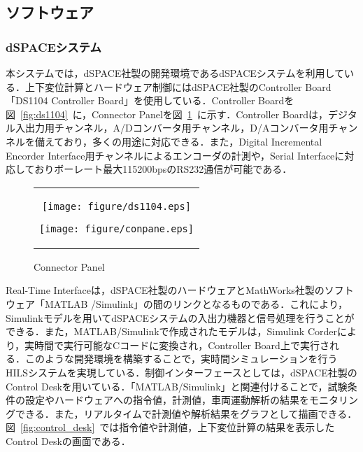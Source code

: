 \documentclass[a4paper,12pt]{article_vdlab_sotsuron}
\begin{document}
\newpage
\subsection{ソフトウェア}
\subsubsection{dSPACEシステム}
本システムでは，dSPACE社製の開発環境であるdSPACEシステムを利用している．上下変位計算とハードウェア制御にはdSPACE社製のController Board「DS1104 Controller Board」を使用している．Controller Boardを図~\ref{fig:ds1104}~に，Connector Panelを図~\ref{fig:conpane}~に示す．Controller Boardは，デジタル入出力用チャンネル，A/Dコンバータ用チャンネル，D/Aコンバータ用チャンネルを備えており，多くの用途に対応できる．また，Digital Incremental Encorder Interface用チャンネルによるエンコーダの計測や，Serial Interfaceに対応しておりボーレート最大115200bpsのRS232通信が可能である．

\vspace{10mm}
\begin{figure}[h]
    \begin{tabular}{c}
      \begin{minipage}{0.5\hsize}
	\begin{center}
	  \texttt{[image: figure/ds1104.eps]}
	  \caption{Controller Borad\cite{66}}
	  \label{fig:ds1104}
	\end{center}
      \end{minipage}
      \begin{minipage}{0.5\hsize}
	\begin{center}
	  \texttt{[image: figure/conpane.eps]}
	  \caption{Connector Panel\cite{66}}
	  \label{fig:conpane}
	\end{center}
      \end{minipage}
    \end{tabular}
\end{figure}

\vspace{10mm}
Real-Time Interfaceは，dSPACE社製のハードウェアとMathWorks社製のソフトウェア「MATLAB /Simulink」の間のリンクとなるものである．これにより，Simulinkモデルを用いてdSPACEシステムの入出力機器と信号処理を行うことができる．また，MATLAB/Simulinkで作成されたモデルは，Simulink Corderにより，実時間で実行可能なCコードに変換され，Controller Board上で実行される．このような開発環境を構築することで，実時間シミュレーションを行うHILSシステムを実現している．制御インターフェースとしては，dSPACE社製のControl Deskを用いている．「MATLAB/Simulink」と関連付けることで，試験条件の設定やハードウェアへの指令値，計測値，車両運動解析の結果をモニタリングできる．また，リアルタイムで計測値や解析結果をグラフとして描画できる．図~\ref{fig:control_desk}~では指令値や計測値，上下変位計算の結果を表示したControl Deskの画面である．
\end{document}
